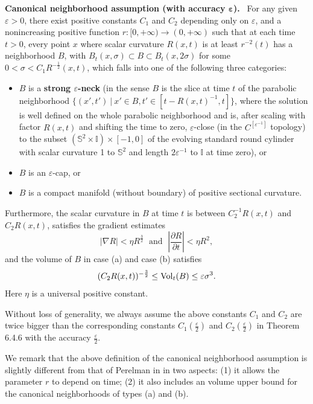 \medskip
{\bf Canonical neighborhood assumption (with accuracy $\boldsymbol
\varepsilon$).} \ For any given $\varepsilon >0$, there
exist positive constants $C_1$ and $C_2$ depending only on
$\varepsilon$, and a nonincreasing positive function $r:
[0,+\infty) \rightarrow (0,+\infty)$ such that at each time $t>0$,
every point $x$ where scalar curvature $R(x,t)$ is at least
$r^{-2}(t)$ has a neighborhood $B$, with $B_t(x,\sigma)\subset B
\subset B_t(x,2\sigma)$ for some $ 0<\sigma <
C_1R^{-\frac{1}{2}}(x,t)$, which falls into one of the following
three categories:
\begin{itemize}
\item[(a)] $B$ is a \textbf{strong
$\varepsilon$-neck} (in the sense
$B$ is the slice at time $t$ of the parabolic neighborhood
$\{(x',t')\ |\ x'\in B, t'\in[t-R(x,t)^{-1},t]\}$, where the
solution is well defined on the whole parabolic neighborhood and
is, after scaling with factor $R(x,t)$ and shifting the time to
zero, $\varepsilon$-close (in the $C^{[\varepsilon^{-1}]}$
topology) to the subset $(\mathbb{S}^2 \times \mathbb{I}) \times
[-1,0]$ of the evolving standard round cylinder with scalar
curvature 1 to $\mathbb{S}^2$ and length $2\varepsilon^{-1}$ to
$\mathbb{I}$ at time zero), or \item[(b)] $B$ is an
$\varepsilon$-cap, or \item[(c)] $B$ is a compact manifold
(without boundary) of positive sectional curvature.
\end{itemize}
Furthermore, the scalar curvature in $B$ at time $t$ is between
$C^{-1}_2R(x,t)$ and $C_2R(x,t)$, satisfies the gradient estimates
\begin{equation} |\nabla R|<\eta R^{\frac{3}{2}}\;  \mbox{ and }\;
\left|\frac{\partial R}{\partial t}\right|<\eta R^2, %
\end{equation} and the volume of $B$ in case (a) and case (b) satisfies
$$
(C_2R(x,t))^{-\frac{3}{2}} \leq \operatorname{Vol}_t(B) \leq \varepsilon
\sigma^3.
$$
Here $\eta$ is a universal positive constant.

\medskip
Without loss of generality, we always assume the above constants
$C_1$ and $C_2$ are twice bigger than the corresponding constants
$C_1(\frac{\varepsilon}{2})$ and $C_2(\frac{\varepsilon}{2})$ in
Theorem 6.4.6 with the accuracy $\frac{\varepsilon}{2}$.

We remark that the above definition of the canonical neighborhood
assumption is slightly different from that of Perelman in
\cite{P2} in two aspects: (1) it allows the parameter $r$ to
depend on time; (2) it also includes an volume upper bound for the
canonical neighborhoods of types (a) and (b).

